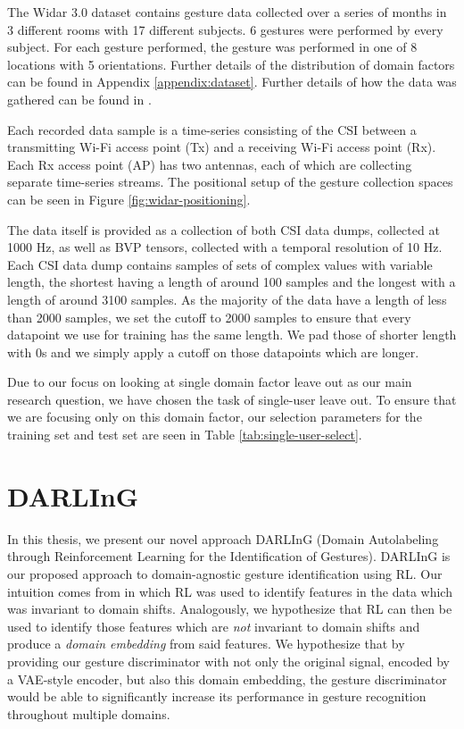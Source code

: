 The Widar 3.0 dataset \cite{zheng2019zero} contains gesture data collected over a series of months in 3 different rooms with 17 different subjects.
6 gestures were performed by every subject.
For each gesture performed, the gesture was performed in one of 8 locations with 5 orientations.
Further details of the distribution of domain factors can be found in Appendix \ref{appendix:dataset}.
Further details of how the data was gathered can be found in \cite{zheng2019zero}.

Each recorded data sample is a time-series consisting of the CSI between a transmitting Wi-Fi access point (Tx) and a receiving Wi-Fi access point (Rx).
Each Rx access point (AP) has two antennas, each of which are collecting separate time-series streams.
The positional setup of the gesture collection spaces can be seen in Figure \ref{fig:widar-positioning}.

The data itself is provided as a collection of both CSI data dumps, collected at 1000 Hz, as well as BVP tensors, collected with a temporal resolution of 10 Hz.
Each CSI data dump contains samples of sets of complex values with variable length, the shortest having a length of around 100 samples and the longest with a length of around 3100 samples. 
As the majority of the data have a length of less than 2000 samples, we set the cutoff to 2000 samples to ensure that every datapoint we use for training has the same length. 
We pad those of shorter length with 0s and we simply apply a cutoff on those datapoints which are longer.

Due to our focus on looking at single domain factor leave out as our main research question, we have chosen the task of single-user leave out.
To ensure that we are focusing only on this domain factor, our selection parameters for the training set and test set are seen in Table \ref{tab:single-user-select}.

\section{DARLInG}

In this thesis, we present our novel approach DARLInG (Domain Autolabeling through Reinforcement Learning for the Identification of Gestures).
DARLInG is our proposed approach to domain-agnostic gesture identification using RL.
Our intuition comes from \cite{zhang2021adversarial} in which RL was used to identify features in the data which was invariant to domain shifts.
Analogously, we hypothesize that RL can then be used to identify those features which are \textit{not} invariant to domain shifts and produce a \textit{domain embedding} from said features.
We hypothesize that by providing our gesture discriminator with not only the original signal, encoded by a VAE-style encoder, but also this domain embedding, the gesture discriminator would be able to significantly increase its performance in gesture recognition throughout multiple domains.

